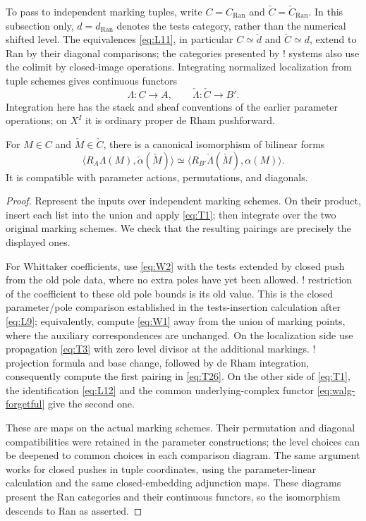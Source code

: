 To pass to independent marking tuples, write $C=C_{\mathrm{Ran}}$ and
$\check C=\check C_{\mathrm{Ran}}$.  In this subsection only, $d=d_{\mathrm{Ran}}$
denotes the tests category, rather than the numerical shifted level.
The equivalences \eqref{eq:L11}, in particular
$C\simeq\check d$ and $\check C\simeq d$, extend to Ran by their diagonal
comparisons; the categories presented by ! systems also use the colimit
by closed-image operations.  Integrating normalized localization from
tuple schemes gives continuous functors
\[
                \Lambda:C\longrightarrow A,
       \qquad \check\Lambda:\check C\longrightarrow B'.
\]
Integration here has the stack and sheaf conventions of the earlier
parameter operations; on $X^I$ it is ordinary proper de Rham pushforward.

\begin{proposition}\label{prop:ran-pairing}
For $M\in C$ and $\check M\in\check C$, there is a canonical isomorphism
of bilinear forms
\begin{equation}\label{eq:T26}
 \bigl\langle R_A\Lambda(M),\check\alpha(\check M)\bigr\rangle
 \simeq
 \bigl\langle R_{B'}\check\Lambda(\check M),\alpha(M)\bigr\rangle.
\end{equation}
It is compatible with parameter actions, permutations, and diagonals.
\end{proposition}

\begin{proof}
Represent the inputs over independent marking schemes.  On their product,
insert each list into the union and apply \eqref{eq:T1}; then integrate
over the two original marking schemes.  We check that the resulting
pairings are precisely the displayed ones.

For Whittaker coefficients, use \eqref{eq:W2} with the tests extended by
closed push from the old pole data, where no extra poles have yet been
allowed.  ! restriction of the coefficient to these old pole bounds is
its old value.  This is the closed parameter/pole comparison established
in the tests-insertion calculation after \eqref{eq:L9}; equivalently,
compute \eqref{eq:W1} away from the union of marking points, where the
auxiliary correspondences are unchanged.  On the localization side use
propagation \eqref{eq:T3} with zero level divisor at the additional
markings.  ! projection formula and base change, followed by de Rham
integration, consequently compute the first pairing in \eqref{eq:T26}.
On the other side of \eqref{eq:T1}, the identification \eqref{eq:L12}
and the common underlying-complex functor \eqref{eq:walg-forgetful}
give the second one.

These are maps on the actual marking schemes.  Their permutation and
diagonal compatibilities were retained in the parameter constructions;
the level choices can be deepened to common choices in each comparison
diagram.  The same argument works for closed pushes in tuple coordinates,
using the parameter-linear calculation and the same closed-embedding
adjunction maps.  These diagrams present the Ran categories and their
continuous functors, so the isomorphism descends to Ran as asserted.
\end{proof}

